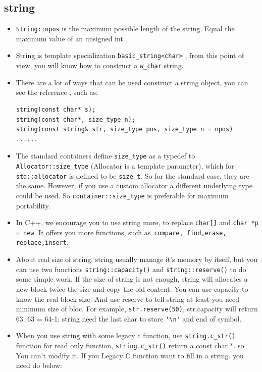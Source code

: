 \documentclass[a4paper,11pt,twoside]{book}
\begin{document}
\subsection{string}
\begin{itemize}
	\item \texttt{String::npos} is the maximum possible length of the string. Equal the maximum value of an unsigned int.
	
	\item String is template specialization \texttt{basic\_string<char>} , from this point of view, you will know how to construct a \texttt{w\_char} string.
	
	\item There are a lot of ways that can be used construct a string object, you can see the reference , such as:
\begin{lstlisting}[numbers=none]
string(const char* s);
string(const char*, size_type n);
string(const string& str, size_type pos, size_type n = npos)
......
\end{lstlisting}
	
	\item The standard containers define \texttt{size\_type} as a typedef to \texttt{Allocator::size\_type} (Allocator is a template parameter), which for \texttt{std::allocator} is defined to be \texttt{size\_t}. So for the standard case, they are the same. However, if you use a custom allocator a different underlying type could be used. So \texttt{container::size\_type} is preferable for maximum portability.
	
	\item In C++, we encourage you to use string more, to replace \texttt{char[]} and \texttt{char *p = new}.  It offers you more functions, such as\texttt{ compare, find,erase, replace,insert}.
	
	\item About real size of string, string usually manage it's memory by itself, but you can use two functions \texttt{string::capacity()} and \texttt{string::reserve()} to do some simple work. If the size of string is not enough, string will allocates a new block twice the size and copy the old content. You can use capacity to know the real block size. And use reserve to tell string at least you need minimum size of bloc. For example, \texttt{str.reserve(50)},  str.capacity will return 63. 63 = 64-1; string need the last char to store \verb='\n'= and end of symbol.
	
	\item When you use string with some legacy c function, use \texttt{string.c\_str()} function for read only function, \texttt{string.c\_str()} return a const char *. so You can't modify it. If you Legacy C function want to fill in a string. you need do below:
	

\end{itemize}
\end{document}
